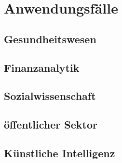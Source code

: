 \documentclass[../main.tex]{subfiles}
\begin{document}
\chapter{Anwendungsfälle}
\section{Gesundheitswesen}
\section{Finanzanalytik}
\section{Sozialwissenschaft}
\section{öffentlicher Sektor}
\section{Künstliche Intelligenz}
\end{document}
